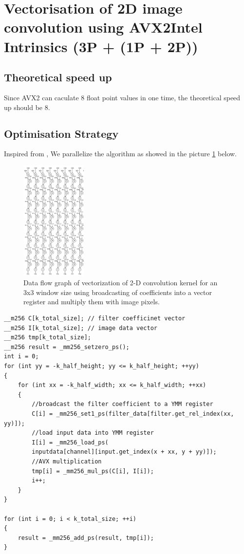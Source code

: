 \documentclass[article]{scrartcl}
\begin{document}
\section{Vectorisation of 2D image convolution using AVX2Intel Intrinsics (3P + (1P + 2P))}
\subsection{ Theoretical speed up }
Since AVX2 can caculate 8 float point values in one time, the theoretical speed up should be 8.

\subsection{ Optimisation Strategy }
Inspired from \cite{8310675}, We parallelize the algorithm as showed in the picture \ref{fig:2D_strategy} below.

\begin{figure}[htpb]
    \centering
    \includegraphics[width=\textwidth,height=6cm,keepaspectratio=true]{../figs/2D_strategy.png}
    \caption{Data flow graph of vectorization of 2-D convolution kernel for an
    3x3 window size using broadcasting of coefficients into a vector register
    and multiply them with image pixels\cite{8310675}.}
    \label{fig:2D_strategy}
\end{figure}


\begin{lstlisting}[frame=single]
__m256 C[k_total_size]; // filter coefficinet vector
__m256 I[k_total_size]; // image data vector
__m256 tmp[k_total_size];
__m256 result = _mm256_setzero_ps();
int i = 0;
for (int yy = -k_half_height; yy <= k_half_height; ++yy)
{
    for (int xx = -k_half_width; xx <= k_half_width; ++xx)
    {
        //broadcast the filter coefficient to a YMM register
        C[i] = _mm256_set1_ps(filter_data[filter.get_rel_index(xx, yy)]);
        //load input data into YMM register
        I[i] = _mm256_load_ps(
        inputdata[channel][input.get_index(x + xx, y + yy)]);
        //AVX multiplication
        tmp[i] = _mm256_mul_ps(C[i], I[i]);
        i++;
    }
}

for (int i = 0; i < k_total_size; ++i)
{
    result = _mm256_add_ps(result, tmp[i]);
}
\end{lstlisting}
\end{document}

